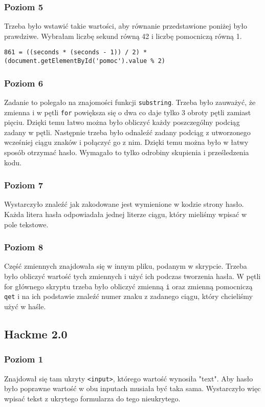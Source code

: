 \documentclass[12pt,a4paper,titlepage]{article}
\begin{document}
\subsubsection{Poziom 5}
Trzeba było wstawić takie wartości, aby równanie przedstawione poniżej było prawdziwe. Wybrałam liczbę sekund równą 42 i liczbę pomocniczą równą 1.
\begin{listing}[H]
\begin{verbatim}
861 = ((seconds * (seconds - 1)) / 2) * (document.getElementById('pomoc').value % 2)
\end{verbatim}
\end{listing}
\subsubsection{Poziom 6}
Zadanie to polegało na znajomości funkcji \texttt{substring}. Trzeba było zauważyć, że zmienna i w pętli \texttt{for} powiększa się o dwa co daje tylko 3 obroty pętli zamiast pięciu. Dzięki temu łatwo można było obliczyć każdy poszczególny podciąg zadany w pętli. Następnie trzeba było odnaleźć zadany podciąg z utworzonego wcześniej ciągu znaków i połączyć go z nim. Dzięki temu można było w łatwy sposób otrzymać hasło. Wymagało to tylko odrobiny skupienia i prześledzenia kodu.
\subsubsection{Poziom 7}
Wystarczyło znaleźć jak zakodowane jest wymienione w kodzie strony hasło. Każda litera hasła odpowiadała jednej literze ciągu, który mieliśmy wpisać w pole tekstowe.
\subsubsection{Poziom 8}
Część zmiennych znajdowała się w innym pliku, podanym w skrypcie. Trzeba było obliczyć wartość tych zmiennych i użyć ich podczas tworzenia hasła. W pętli for głównego skryptu trzeba było obliczyć zmienną \texttt{i} oraz zmienną pomocniczą \texttt{qet} i na ich podstawie znaleźć numer znaku z zadanego ciągu, który chcieliśmy użyć w haśle.

\subsection{Hackme 2.0}
\subsubsection{Poziom 1}
Znajdował się tam ukryty \texttt{<input>}, którego wartość wynosiła "text". Aby hasło było poprawne wartość w obu inputach musiała być taka sama. Wystarczyło więc wpisać tekst z ukrytego formularza do tego nieukrytego.
\end{document}
